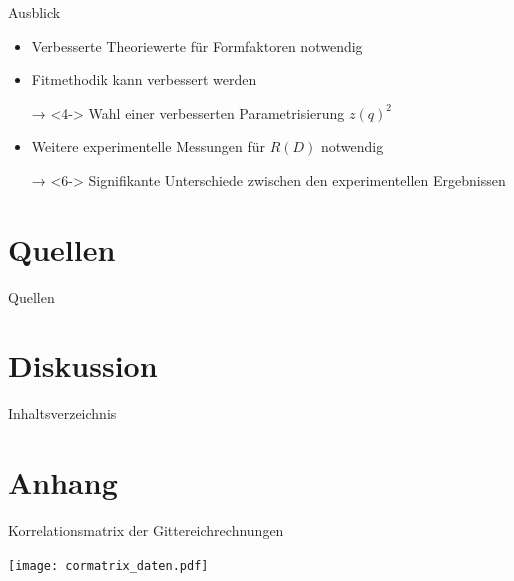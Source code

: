 \documentclass[fleqn, aspectratio=1610, professionalfonts, 9pt]{beamer}
\begin{document}
\begin{frame}{Ausblick}
  \begin{itemize}
    \setlength\itemsep{1em}
    \item<2-> Verbesserte Theoriewerte für Formfaktoren notwendig
    \item<3-> Fitmethodik kann verbessert werden
    \item[→]<4-> Wahl einer verbesserten Parametrisierung $z(q)^2$
    \item<5-> Weitere experimentelle Messungen für $R(D)$ notwendig
    \item[→]<6-> Signifikante Unterschiede zwischen den experimentellen Ergebnissen

  \end{itemize}
\end{frame}

\section{Quellen}

\begin{frame}{Quellen}
  \tableofcontents[currentsection,currentsubsection,
      hideothersubsections,
      sectionstyle=show/shaded,
  ]\end{frame}

\begin{frame}[allowframebreaks]
    \printbibliography
\end{frame}

\section{Diskussion}

\begin{frame}{Inhaltsverzeichnis}
  \tableofcontents[currentsection,currentsubsection,
      hideothersubsections,
      sectionstyle=show/shaded,
  ]\end{frame}



\appendix
\section{Anhang}

\begin{frame}{Korrelationsmatrix der Gittereichrechnungen}
  \begin{center}
    \texttt{[image: cormatrix\_daten.pdf]}
  \end{center}
\end{frame}
\end{document}
